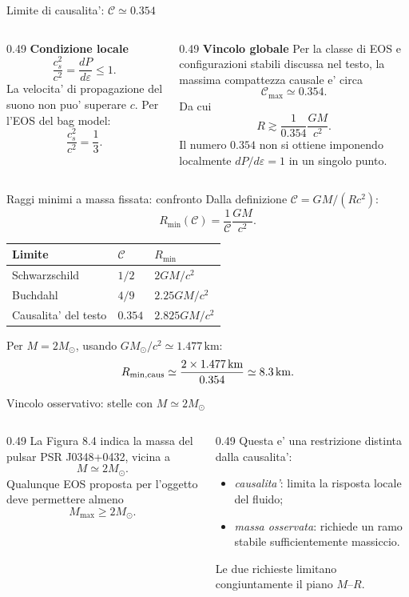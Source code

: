 \begin{frame}{Limite di causalita': $\mathcal C\simeq0.354$}
\small
\begin{columns}[T,onlytextwidth]
\begin{column}{0.49\textwidth}
\textbf{Condizione locale}
\[
\frac{c_s^2}{c^2}=\frac{dP}{d\varepsilon}\leq1.
\]
La velocita' di propagazione del suono non puo' superare $c$.
\medskip
Per l'EOS del bag model:
\[
\frac{c_s^2}{c^2}=\frac13.
\]
\end{column}
\begin{column}{0.49\textwidth}
\textbf{Vincolo globale}
Per la classe di EOS e configurazioni stabili discussa nel testo, la massima compattezza causale e' circa
\[
\mathcal C_{\max}\simeq0.354.
\]
Da cui
\[
R\gtrsim\frac{1}{0.354}\frac{GM}{c^2}.
\]
Il numero $0.354$ non si ottiene imponendo localmente $dP/d\varepsilon=1$ in un singolo punto.
\end{column}
\end{columns}
\end{frame}

\begin{frame}{Raggi minimi a massa fissata: confronto}
\small
Dalla definizione $\mathcal C=GM/(Rc^2)$:
\[
R_{\min}(\mathcal C)=\frac{1}{\mathcal C}\frac{GM}{c^2}.
\]
\medskip
\begin{center}
\begin{tabular}{lll}
\hline
Limite & $\mathcal C$ & $R_{\min}$ \\
\hline
Schwarzschild & $1/2$ & $2GM/c^2$ \\
Buchdahl & $4/9$ & $2.25GM/c^2$ \\
Causalita' del testo & $0.354$ & $2.825GM/c^2$ \\
\hline
\end{tabular}
\end{center}
\medskip
Per $M=2M_\odot$, usando $GM_\odot/c^2\simeq1.477\,\mathrm{km}$:
\[
R_{\min,\rm caus}\simeq\frac{2\times1.477\,\mathrm{km}}{0.354}
\simeq8.3\,\mathrm{km}.
\]
\end{frame}

\begin{frame}{Vincolo osservativo: stelle con $M\simeq2M_\odot$}
\small
\begin{columns}[T,onlytextwidth]
\begin{column}{0.49\textwidth}
La Figura 8.4 indica la massa del pulsar PSR J0348+0432, vicina a
\[
M\simeq2M_\odot.
\]
Qualunque EOS proposta per l'oggetto deve permettere almeno
\[
M_{\max}\geq2M_\odot.
\]
\end{column}
\begin{column}{0.49\textwidth}
Questa e' una restrizione distinta dalla causalita':
\begin{itemize}
\item \emph{causalita'}: limita la risposta locale del fluido;
\item \emph{massa osservata}: richiede un ramo stabile sufficientemente massiccio.
\end{itemize}
Le due richieste limitano congiuntamente il piano $M$--$R$.
\end{column}
\end{columns}
\end{frame}

